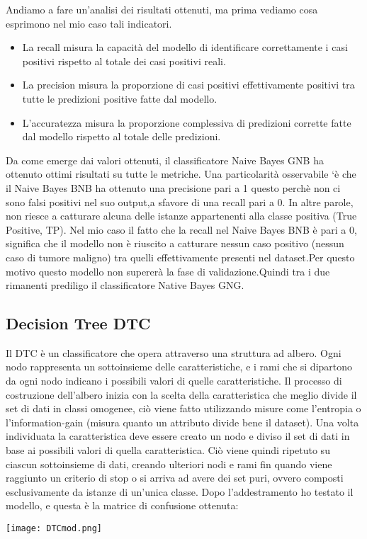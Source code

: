\documentclass{article}
\begin{document}
Andiamo a fare un’analisi dei risultati ottenuti, ma prima vediamo cosa esprimono nel mio caso
tali indicatori.
\begin{itemize}
    \item La recall misura la capacità del modello di identificare correttamente i casi positivi rispetto al totale dei casi positivi reali.
    \item La precision misura la proporzione di casi positivi effettivamente positivi tra tutte le predizioni positive fatte dal modello.
    \item L'accuratezza misura la proporzione complessiva di predizioni corrette fatte dal modello rispetto al totale delle predizioni.
\end{itemize}
Da come emerge dai valori ottenuti, il classificatore Naive Bayes GNB ha ottenuto ottimi risultati su tutte le metriche. Una particolarità osservabile `è che il Naive Bayes BNB ha ottenuto una precisione pari a 1 questo perchè non ci sono falsi positivi nel suo output,a sfavore di una recall pari a 0. In altre parole, non riesce a catturare alcuna delle istanze appartenenti alla classe positiva (True Positive, TP).
Nel mio caso il fatto che la recall nel Naive Bayes BNB è pari a 0, significa che il modello non è riuscito a catturare nessun caso positivo (nessun caso di tumore maligno) tra quelli effettivamente presenti nel dataset.Per questo motivo questo modello non supererà la fase di validazione.Quindi tra i due rimanenti prediligo il classificatore Native Bayes GNG.

\newpage
\subsection{Decision Tree DTC}
Il DTC è un classificatore che opera attraverso una struttura ad albero. Ogni nodo rappresenta un sottoinsieme delle caratteristiche, e i rami che si dipartono da ogni nodo indicano i possibili valori di quelle caratteristiche. Il processo di costruzione dell’albero inizia con la scelta della caratteristica che meglio divide il set di dati in classi omogenee, ciò viene fatto utilizzando misure come l’entropia o l’information-gain (misura quanto un attributo divide bene il dataset). Una volta individuata la caratteristica deve essere creato un nodo e diviso il set di dati in base ai possibili valori di quella caratteristica. Ciò viene quindi ripetuto su ciascun sottoinsieme di dati, creando ulteriori nodi e rami fin quando viene raggiunto un criterio di stop o si arriva ad avere dei set puri, ovvero composti esclusivamente da istanze di un’unica classe. Dopo l’addestramento ho testato il modello, e questa è la matrice di confusione ottenuta:
\begin{center}
  \texttt{[image: DTCmod.png]}
\end{center}
\end{document}
